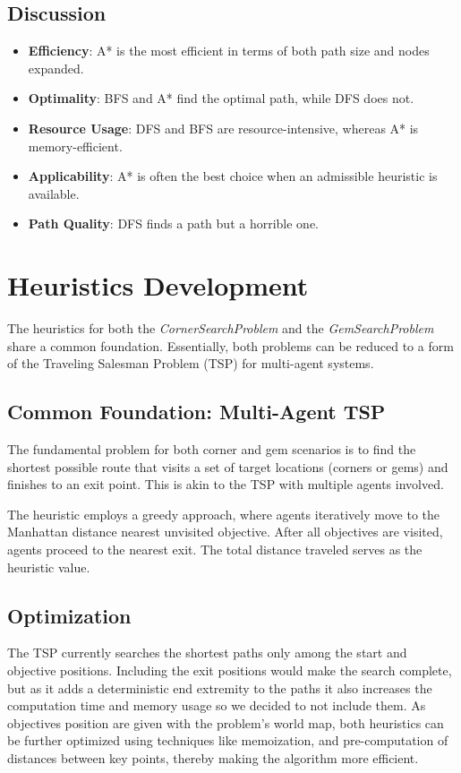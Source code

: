 \documentclass{article}
\begin{document}
\subsection{Discussion}
\begin{itemize}
    \item \textbf{Efficiency}: A* is the most efficient in terms of both path size and nodes expanded.
    \item \textbf{Optimality}: BFS and A* find the optimal path, while DFS does not.
    \item \textbf{Resource Usage}: DFS and BFS are resource-intensive, whereas A* is memory-efficient.
    \item \textbf{Applicability}: A* is often the best choice when an admissible heuristic is available.
    \item \textbf{Path Quality}: DFS finds a path but a horrible one.
\end{itemize}    

\section{Heuristics Development}

    The heuristics for both the \textit{CornerSearchProblem} and the \textit{GemSearchProblem} share a common foundation. 
    Essentially, both problems can be reduced to a form of the Traveling Salesman Problem (TSP) for multi-agent systems. 
    
    \subsection{Common Foundation: Multi-Agent TSP}
    The fundamental problem for both corner and gem scenarios is to 
    find the shortest possible route that visits a set of target locations (corners or gems) 
    and finishes to an exit point. This is akin to the TSP with multiple agents involved. 

    The heuristic employs a greedy approach, 
    where agents iteratively move to the Manhattan distance nearest unvisited objective. 
    After all objectives are visited, agents proceed to the nearest exit. 
    The total distance traveled serves as the heuristic value.

    \subsection{Optimization}
    The TSP currently searches the shortest paths only among the start and objective positions.
    Including the exit positions would make the search complete, but as it adds a deterministic end 
    extremity to the paths it also increases the computation time and memory usage so we decided to not include them.
    As objectives position are given with the problem's world map, 
    both heuristics can be further optimized using techniques like memoization, 
    and pre-computation of distances between key points, thereby making the algorithm more efficient.
\end{document}
